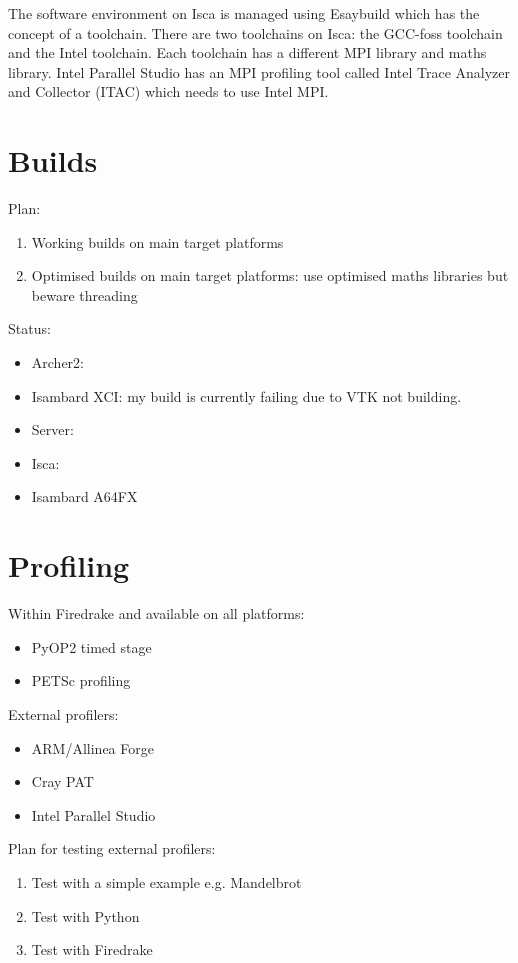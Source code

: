 \documentclass[a4paper,titlepage]{article}
\begin{document}
The software environment on Isca is managed using Esaybuild which has the concept of a toolchain. There are two toolchains on Isca: the GCC-foss toolchain and the Intel toolchain. Each toolchain has a different MPI library and maths library. Intel Parallel Studio has an MPI profiling tool called Intel Trace Analyzer and Collector (ITAC) which needs to use Intel MPI.



\section{Builds}

Plan:
\begin{enumerate}
\item Working builds on main target platforms
\item Optimised builds on main target platforms: use optimised maths libraries but beware threading
\end{enumerate}
%
Status:
\begin{itemize}
\item Archer2:
\item Isambard XCI: my build is currently failing due to VTK not building.
\item Server:
\item Isca:
\item Isambard A64FX
\end{itemize}


\section{Profiling}

Within Firedrake and available on all platforms:
\begin{itemize}
\item PyOP2 timed stage
\item PETSc profiling
\end{itemize}
External profilers:
\begin{itemize}
\item ARM/Allinea Forge
\item Cray PAT
\item Intel Parallel Studio
\end{itemize}
%
Plan for testing external profilers:
\begin{enumerate}
\item Test with a simple example e.g. Mandelbrot
\item Test with Python
\item Test with Firedrake
\end{enumerate}
\end{document}
